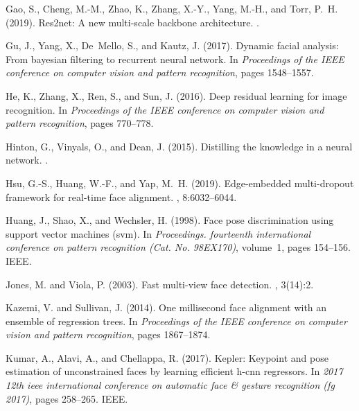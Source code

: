 \documentclass[a4paper,twoside]{article}
\begin{document}
{\begin{thebibliography}{}
Gao, S., Cheng, M.-M., Zhao, K., Zhang, X.-Y., Yang, M.-H., and Torr, P.~H.
  (2019).
\newblock Res2net: A new multi-scale backbone architecture.
.

Gu, J., Yang, X., De~Mello, S., and Kautz, J. (2017).
\newblock Dynamic facial analysis: From bayesian filtering to recurrent neural
  network.
\newblock In {\em Proceedings of the IEEE conference on computer vision and
  pattern recognition}, pages 1548--1557.

He, K., Zhang, X., Ren, S., and Sun, J. (2016).
\newblock Deep residual learning for image recognition.
\newblock In {\em Proceedings of the IEEE conference on computer vision and
  pattern recognition}, pages 770--778.

Hinton, G., Vinyals, O., and Dean, J. (2015).
\newblock Distilling the knowledge in a neural network.
.

Hsu, G.-S., Huang, W.-F., and Yap, M.~H. (2019).
\newblock Edge-embedded multi-dropout framework for real-time face alignment.
, 8:6032--6044.

Huang, J., Shao, X., and Wechsler, H. (1998).
\newblock Face pose discrimination using support vector machines (svm).
\newblock In {\em Proceedings. fourteenth international conference on pattern
  recognition (Cat. No. 98EX170)}, volume~1, pages 154--156. IEEE.

Jones, M. and Viola, P. (2003).
\newblock Fast multi-view face detection.
, 3(14):2.

Kazemi, V. and Sullivan, J. (2014).
\newblock One millisecond face alignment with an ensemble of regression trees.
\newblock In {\em Proceedings of the IEEE conference on computer vision and
  pattern recognition}, pages 1867--1874.

Kumar, A., Alavi, A., and Chellappa, R. (2017).
\newblock Kepler: Keypoint and pose estimation of unconstrained faces by
  learning efficient h-cnn regressors.
\newblock In {\em 2017 12th ieee international conference on automatic face \&
  gesture recognition (fg 2017)}, pages 258--265. IEEE.


\end{thebibliography}}
\end{document}
